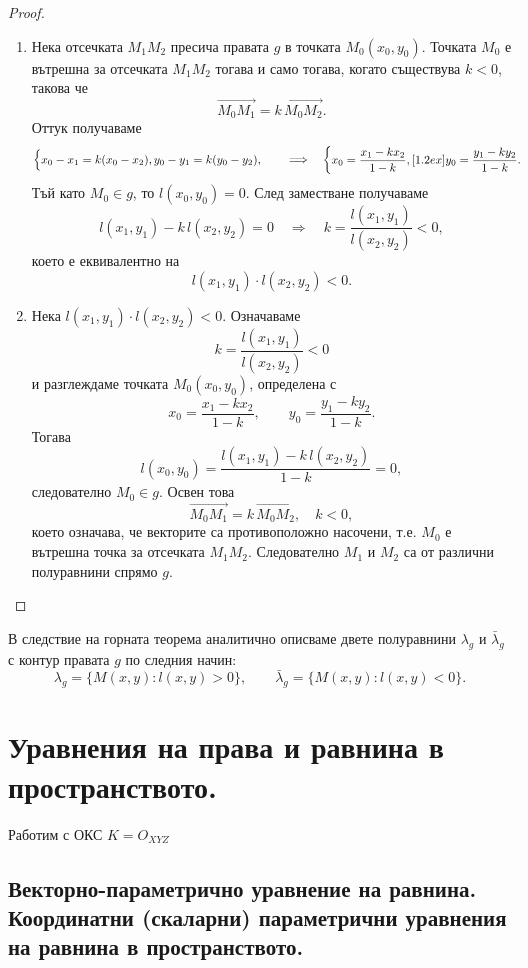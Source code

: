 \documentclass{article}
\renewcommand{\\}{\newline}
\begin{document}
\begin{proof}
\begin{enumerate}
\item[$(\Rightarrow)$] Нека отсечката $M_1M_2$ пресича правата $g$ в точката $M_0(x_0, y_0)$. Точката $M_0$ е вътрешна за отсечката $M_1M_2$ тогава и само тогава, когато съществува $k < 0$, такова че
\[
\overrightarrow{M_0M_1} = k \, \overrightarrow{M_0M_2}.
\]
Оттук получаваме
\[
\begin{cases}
x_0 - x_1 = k(x_0 - x_2), \\
y_0 - y_1 = k(y_0 - y_2),
\end{cases}
\quad\Longrightarrow\quad
\begin{cases}
x_0 = \dfrac{x_1 - kx_2}{1 - k},\\[1.2ex]
y_0 = \dfrac{y_1 - ky_2}{1 - k}.
\end{cases}
\]
Тъй като $M_0 \in g$, то $l(x_0, y_0) = 0$. След заместване получаваме
\[
l(x_1, y_1) - k\,l(x_2, y_2) = 0
\quad\Longrightarrow\quad
k = \frac{l(x_1, y_1)}{l(x_2, y_2)} < 0,
\]
което е еквивалентно на
\[
l(x_1, y_1) \cdot l(x_2, y_2) < 0.
\]

\item[$(\Leftarrow)$] Нека $l(x_1, y_1) \cdot l(x_2, y_2) < 0$. Означаваме
\[
k = \frac{l(x_1, y_1)}{l(x_2, y_2)} < 0
\]
и разглеждаме точката $M_0(x_0, y_0)$, определена с
\[
x_0 = \frac{x_1 - kx_2}{1 - k}, \qquad y_0 = \frac{y_1 - ky_2}{1 - k}.
\]
Тогава
\[
l(x_0, y_0) = \frac{l(x_1, y_1) - k\,l(x_2, y_2)}{1 - k} = 0,
\]
следователно $M_0 \in g$. Освен това
\[
\overrightarrow{M_0M_1} = k \, \overrightarrow{M_0M_2}, \quad k < 0,
\]
което означава, че векторите са противоположно насочени, т.е. $M_0$ е вътрешна точка за отсечката $M_1M_2$. Следователно $M_1$ и $M_2$ са от различни полуравнини спрямо $g$.
\end{enumerate}
\end{proof}

В следствие на горната теорема аналитично описваме двете полуравнини $\lambda_g$ и $\bar{\lambda}_g$ с контур правата $g$ по следния начин:
\[
\lambda_g = \bigl\{ M(x, y) : l(x, y) > 0 \bigr\}, \qquad
\bar{\lambda}_g = \bigl\{ M(x, y) : l(x, y) < 0 \bigr\}.
\]
\newpage

\section{Уравнения на права и равнина в пространството.}
Работим с ОКС \(K = O_{XYZ}\)  
\subsection{Векторно-параметрично уравнение на равнина. Координатни (скаларни) параметрични уравнения на равнина в пространството.}
\end{document}
